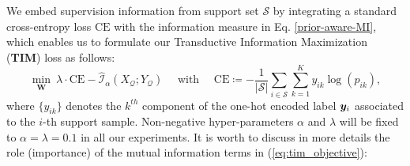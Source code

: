 \documentclass{article}
\begin{document}
        We embed supervision information from support set $\mathcal{S}$ by integrating a standard cross-entropy loss $\textrm{CE}$ with the information measure in Eq. \eqref{prior-aware-MI}, which enables us to formulate our Transductive Information Maximization (\textbf{TIM}) loss as follows:
\begin{equation}\label{eq:tim_objective}
        	    \boxed{\min_{\mathbf{W}} \ \lambda \cdot \textrm{CE} -   \mathcal{\widehat{I}}_{\alpha}(X_\mathcal{Q}; Y_\mathcal{Q})} \quad
        	    \textrm{ with } \quad \textrm{CE} \coloneqq -\frac{1}{|\mathcal{S}|} \sum_{i \in \mathcal{S}}\sum_{k=1}^K y_{ik} \log (p_{ik}),
        	\end{equation}
        where $\{y_{ik}\}$ denotes the $k^{th}$ component of the one-hot encoded label $\bm{y}_i$ associated to the $i$-th support sample. Non-negative hyper-parameters $\alpha$ and $\lambda$ will be fixed to $\alpha=\lambda=0.1$ in all our experiments. 
It is worth to discuss in more details the role (importance) of the mutual information terms in (\ref{eq:tim_objective}): 
\end{document}
